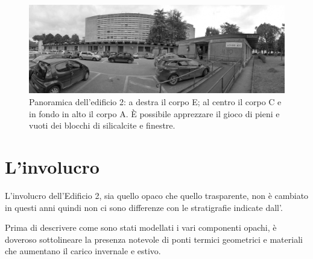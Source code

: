 \begin{figure}
	\centering
	\includegraphics[scale=0.11]{6_2_cap/img/pan}
	\caption[Panoramica dell'edificio 2.]{Panoramica dell'edificio 2: a destra il corpo E; al centro il corpo C e in fondo in alto il corpo A. È possibile apprezzare il gioco di pieni e vuoti dei blocchi di silicalcite e finestre.}\label{pan}
\end{figure}

\clearpage
\section{L'involucro}
L'involucro dell'Edificio 2, sia quello opaco che quello trasparente, non è cambiato in questi anni quindi non ci sono differenze con le stratigrafie indicate dall'.

Prima di descrivere come sono stati modellati i vari componenti opachi, è doveroso sottolineare la presenza notevole di ponti termici geometrici e materiali che aumentano il carico invernale e estivo.

